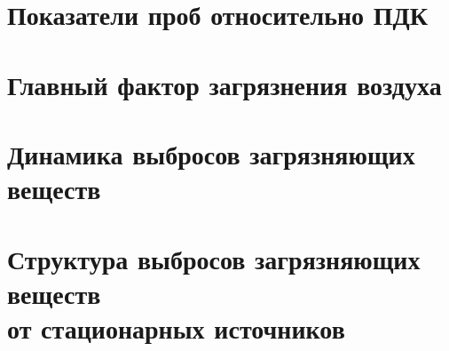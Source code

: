 



\section{Показатели проб относительно ПДК}
\begin{frame}{\insertsectionhead}
\end{frame}

\section{Главный фактор загрязнения воздуха}
\begin{frame}{\insertsectionhead}
\end{frame}

\section{Динамика выбросов загрязняющих веществ}
\begin{frame}{\insertsectionhead}
\end{frame}

\section{Структура выбросов загрязняющих веществ \\ от
стационарных источников}
\begin{frame}{\insertsectionhead}
\end{frame}










